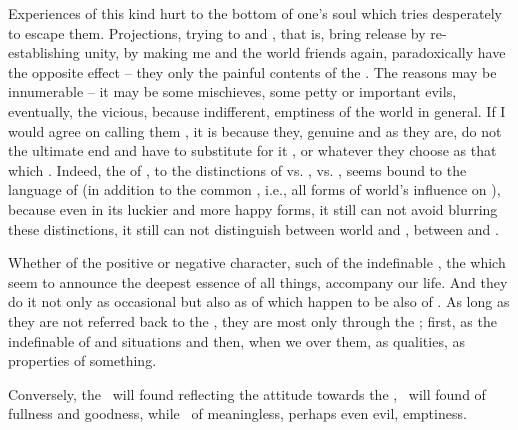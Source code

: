 {  Experiences of this kind hurt to the bottom of one's soul which tries
  desperately to escape them.  Projections, trying to  and
  , that is, bring release by re-establishing unity, by making me
  and the world friends again, paradoxically have the opposite effect -- they
  only  the painful contents of the .  The
   reasons may be innumerable -- it may be some 
  mischieves, some petty or important evils, eventually, the vicious, because
  indifferent, emptiness of the world in general.  If I would agree on calling
  them , it is because they, genuine and  as they are, do not  the ultimate end and have to
  substitute for it ,  or whatever they choose as
  that which .  Indeed, the
   of \No,  to the distinctions of  vs.
  ,  vs.  , seems bound to the
  language of  (in addition to the common ,
  i.e., all forms of world's influence on ), because even in its luckier
  and more happy forms, it still can not avoid blurring these distinctions, it
  still can not distinguish  between world and ,
  between  and .
  
  \pa Whether of the positive or negative character, such  of
  the indefinable , the  which seem to announce
  the deepest essence of all things, accompany our life.  And they do it not
  only as occasional  but also as  of
   which happen to be also  of .  As
  long as they are not referred back to the  , they are
  most  only through the \hoa; first, as the indefinable
   of  and situations and then, when we  over
  them, as qualities, as properties of something.
  
  \pa Conversely, the \sch\ will found  reflecting the attitude
  towards the , \yes\ will found  of fullness
  and goodness, while \No\ of meaningless, perhaps even evil, emptiness.
  
}
